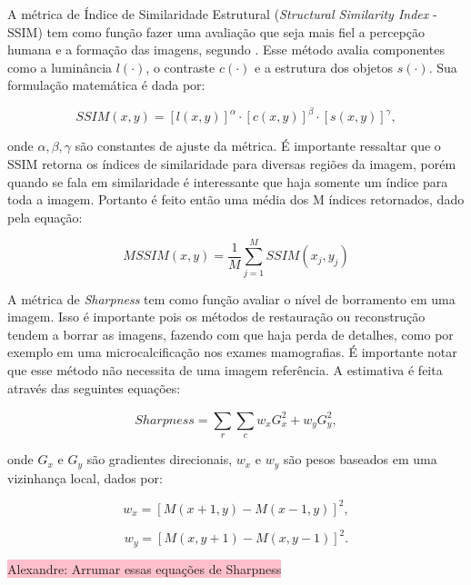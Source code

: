 %


A métrica de Índice de Similaridade Estrutural (\textit{Structural Similarity Index} - \acs{SSIM}) tem como função fazer uma avaliação que seja mais fiel a percepção humana e a formação das imagens, segundo . Esse método avalia componentes como a  luminância $l(\cdot)$, o contraste $c(\cdot)$ e a estrutura dos objetos $s(\cdot)$. Sua formulação matemática é dada por:

\begin{equation}
SSIM(x,y) = [l(x,y)]^{\alpha} \cdot [c(x,y)]^{\beta} \cdot [s(x,y)]^{\gamma},
\label{eq:eqCap4SSIM}
\end{equation}

\noindent onde $\alpha,\beta,\gamma$ são constantes de ajuste da métrica. É importante ressaltar que o \acs{SSIM} retorna os índices de similaridade para diversas regiões da imagem, porém quando se fala em similaridade é interessante que haja somente um índice para toda a imagem. Portanto é feito então uma média dos M índices retornados, dado pela equação:

\begin{equation}
MSSIM(x,y) = \dfrac{1}{M} \sum_{j=1}^{M} SSIM(x_{j},y_{j})
\label{eq:eqCap4MSSIM}
\end{equation} 

A métrica de \textit{Sharpness} tem como função avaliar o nível de borramento em uma imagem. Isso é importante pois os métodos de restauração ou reconstrução tendem a borrar as imagens, fazendo com que haja perda de detalhes, como por exemplo em uma microcalcificação nos exames mamografias. É importante notar que esse método não necessita de uma imagem referência. A estimativa é feita através das seguintes equações:

\begin{equation}
Sharpness = \sum_{r}^{} \sum_{c}^{}  w_{x}G^{2}_{x} + w_{y} G^{2}_{y}, 
\label{eq:eqCap4SHARPDB}
\end{equation}

\noindent onde $G_{x}$ e $G_{y}$ são gradientes direcionais, $w_{x}$ e $w_{y}$ são pesos baseados em uma vizinhança local, dados por:

\begin{equation}
w_{x} = [M(x+1,y)-M(x-1,y)]^{2},
\label{eq:eqCap4SHARPDB1}
\end{equation}

\begin{equation}
w_{y} = [M(x,y+1)-M(x,y-1)]^{2}.
\label{eq:eqCap4SHARPDB2}
\end{equation}

\colorbox{pink}{Alexandre: Arrumar essas equações de Sharpness}
	
